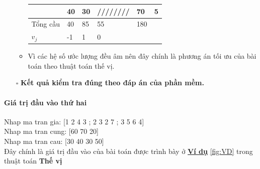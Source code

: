 \documentclass{article}
\begin{document}
\begin{itemize}
\begin{itemize}[label=\textbullet]
\begin{table}[ht]
\begin{center}
\begin{tabular}{|l|w{c}{1.5cm}|w{c}{1.5cm}|w{c}{1.5cm}|l|w{c}{1.5cm}|}
                          & 40  &  30 &//////// &70 & 5\\ \hline
                Tổng cầu  &40 & 85 &  55   &  180 & \\ \hline
                $v_j$  & -1 & 1 &  0   &   & \\ \hline
            \end{tabular}
            \end{center}
        \end{table}
        \item Vì các hệ số ước lượng đều âm nên đây chính là phương án tối ưu của bài toán theo thuật toán thế vị. 
    \end{itemize}
    \item [$\square$] \textbf{Kết quả kiểm tra đúng theo đáp án của phần mềm.}
\end{itemize}
\newpage
\paragraph{Giá trị đầu vào thứ hai}
\begin{flushleft}
\hspace{0.4cm} Nhap ma tran gia: [1 2 4 3 ; 2 3 2 7 ; 3 5 6 4] \medskip \\
\hspace{0.4cm} Nhap ma tran cung: [60 70 20] \medskip \\
\hspace{0.4cm} Nhap ma tran cau: [30 40 30 50] \medskip \\
\hspace{0.4cm} Đây chính là giá trị đầu vào của bài toán được trình bày ở \textbf{\underline{Ví dụ}} \ref{fig:VD} trong thuật toán \textbf{Thế vị}
\end{flushleft}
\end{document}

